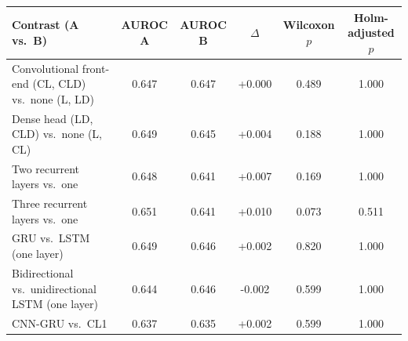 \begin{tabular}{lccccc}
\toprule
Contrast (A vs.\ B) & AUROC A & AUROC B & $\Delta$ & Wilcoxon $p$ & Holm-adjusted $p$ \\
\midrule
Convolutional front-end (CL, CLD) vs.\ none (L, LD) & 0.647 & 0.647 & +0.000 & 0.489 & 1.000 \\
Dense head (LD, CLD) vs.\ none (L, CL) & 0.649 & 0.645 & +0.004 & 0.188 & 1.000 \\
Two recurrent layers vs.\ one & 0.648 & 0.641 & +0.007 & 0.169 & 1.000 \\
Three recurrent layers vs.\ one & 0.651 & 0.641 & +0.010 & 0.073 & 0.511 \\
GRU vs.\ LSTM (one layer) & 0.649 & 0.646 & +0.002 & 0.820 & 1.000 \\
Bidirectional vs.\ unidirectional LSTM (one layer) & 0.644 & 0.646 & -0.002 & 0.599 & 1.000 \\
CNN-GRU vs.\ CL1 & 0.637 & 0.635 & +0.002 & 0.599 & 1.000 \\
\bottomrule
\end{tabular}